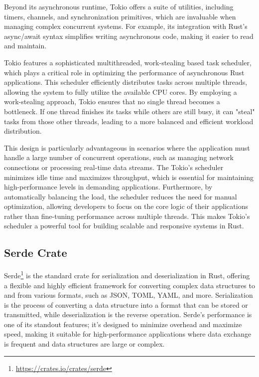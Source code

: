 Beyond its asynchronous runtime, Tokio offers a suite of utilities, including timers, channels, and synchronization primitives, which are invaluable when managing complex concurrent systems. For example, its integration with Rust’s async/await syntax simplifies writing asynchronous code, making it easier to read and maintain.

Tokio features a sophisticated multithreaded, work-stealing based task scheduler, which plays a critical role in optimizing the performance of asynchronous Rust applications. This scheduler efficiently distributes tasks across multiple threads, allowing the system to fully utilize the available CPU cores. By employing a work-stealing approach, Tokio ensures that no single thread becomes a bottleneck. If one thread finishes its tasks while others are still busy, it can "steal" tasks from those other threads, leading to a more balanced and efficient workload distribution.

This design is particularly advantageous in scenarios where the application must handle a large number of concurrent operations, such as managing network connections or processing real-time data streams. The Tokio's scheduler minimizes idle time and maximizes throughput, which is essential for maintaining high-performance levels in demanding applications. Furthermore, by automatically balancing the load, the scheduler reduces the need for manual optimization, allowing developers to focus on the core logic of their applications rather than fine-tuning performance across multiple threads. This makes Tokio's scheduler a powerful tool for building scalable and responsive systems in Rust.

\subsection{Serde Crate}

Serde\footnote{\url{https://crates.io/crates/serde}} is the standard crate for serialization and deserialization in Rust, offering a flexible and highly efficient framework for converting complex data structures to and from various formats, such as JSON, TOML, YAML, and more. Serialization is the process of converting a data structure into a format that can be stored or transmitted, while deserialization is the reverse operation. Serde's performance is one of its standout features; it’s designed to minimize overhead and maximize speed, making it suitable for high-performance applications where data exchange is frequent and data structures are large or complex.

